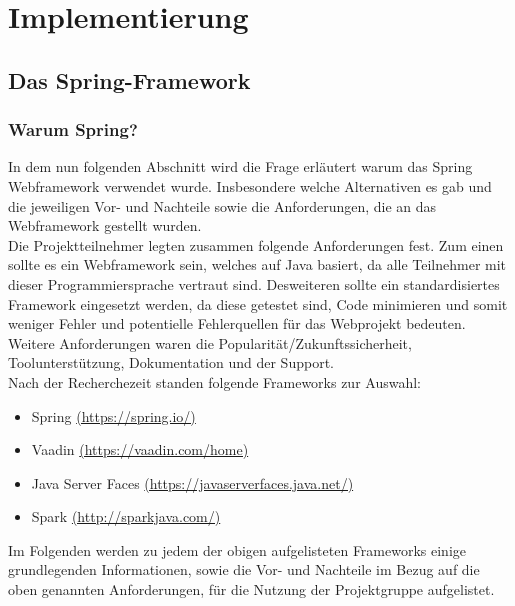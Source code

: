 \chapter{Implementierung}

\section{Das Spring-Framework}
\subsection{Warum Spring?}
In dem nun folgenden Abschnitt wird die Frage erläutert warum das Spring Webframework verwendet 
wurde. Insbesondere welche Alternativen es gab und die jeweiligen Vor- und Nachteile sowie die 
Anforderungen, die an das Webframework gestellt wurden. \\
Die Projektteilnehmer legten zusammen folgende Anforderungen fest. Zum einen sollte es ein Webframework sein, welches auf Java basiert, da alle Teilnehmer mit dieser Programmiersprache vertraut 
sind. Desweiteren sollte ein standardisiertes Framework eingesetzt werden, da diese getestet sind, 
Code minimieren und somit weniger Fehler und potentielle Fehlerquellen für das Webprojekt bedeuten. 
Weitere Anforderungen waren die Popularität/Zukunftssicherheit, Toolunterstützung, Dokumentation 
und der Support. \\
Nach der Recherchezeit standen folgende Frameworks zur Auswahl:
\begin{itemize}
  \item Spring \href{https://spring.io/}{(https://spring.io/)}
  \item Vaadin \href{https://vaadin.com/home}{(https://vaadin.com/home)}
  \item Java Server Faces \href{https://javaserverfaces.java.net/}{(https://javaserverfaces.java.net/)}
  \item Spark \href{http://sparkjava.com/}{(http://sparkjava.com/)}
\end{itemize}
\medskip
Im Folgenden werden zu jedem der obigen aufgelisteten Frameworks einige grundlegenden 
Informationen, sowie die Vor- und Nachteile im Bezug auf die oben genannten Anforderungen, für die 
Nutzung der Projektgruppe aufgelistet. 
